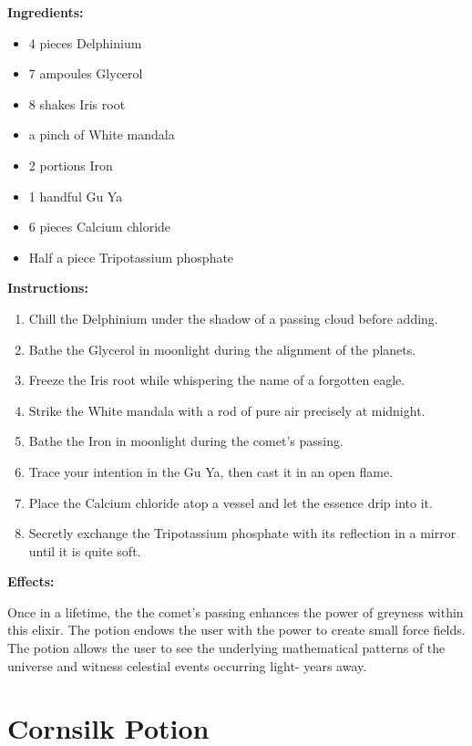 \documentclass{article}
\begin{document}
\textbf{Ingredients:}

\begin{itemize}
  \item 4 pieces Delphinium
  \item 7 ampoules Glycerol
  \item 8 shakes Iris root
  \item a pinch of White mandala
  \item 2 portions Iron
  \item 1 handful Gu Ya
  \item 6 pieces Calcium chloride
  \item Half a piece Tripotassium phosphate
\end{itemize}

\textbf{Instructions:}

\begin{enumerate}
  \item Chill the Delphinium under the shadow of a passing cloud before adding.
  \item Bathe the Glycerol in moonlight during the alignment of the planets.
  \item Freeze the Iris root while whispering the name of a forgotten eagle.
  \item Strike the White mandala with a rod of pure air precisely at midnight.
  \item Bathe the Iron in moonlight during the comet’s passing.
  \item Trace your intention in the Gu Ya, then cast it in an open flame.
  \item Place the Calcium chloride atop a vessel and let the essence drip into it.
  \item Secretly exchange the Tripotassium phosphate with its reflection in a mirror until it is quite soft.
\end{enumerate}

\textbf{Effects:}

Once in a lifetime, the the comet’s passing enhances the power of greyness within this elixir. The potion endows the user with the power to create small force fields. The potion allows the user to see the underlying mathematical patterns of the universe and witness celestial events occurring light- years away.

\newpage
\section*{Cornsilk Potion}
\end{document}
